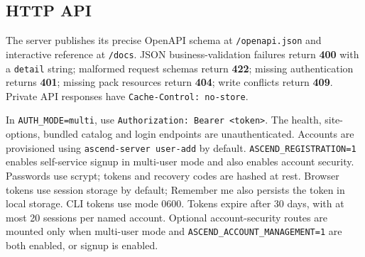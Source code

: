 \hypertarget{http-api}{%
\subsection{HTTP API}\label{http-api}}

The server publishes its precise OpenAPI schema at
\texttt{/openapi.json} and interactive reference at \texttt{/docs}. JSON
business-validation failures return \textbf{400} with a \texttt{detail}
string; malformed request schemas return \textbf{422}; missing
authentication returns \textbf{401}; missing pack resources return
\textbf{404}; write conflicts return \textbf{409}. Private API responses
have \texttt{Cache-Control: no-store}.

In \texttt{AUTH\_MODE=multi}, use
\texttt{Authorization: Bearer \textless{}token\textgreater{}}. The
health, site-options, bundled catalog and login endpoints are unauthenticated.
Accounts are provisioned using \texttt{ascend-server user-add} by default.
\texttt{ASCEND\_REGISTRATION=1} enables self-service signup in multi-user mode
and also enables account security. Passwords use scrypt; tokens and recovery
codes are hashed at rest. Browser tokens use session storage by default;
Remember me also persists the token in local storage. CLI tokens use mode 0600.
Tokens expire after 30 days, with at most 20 sessions per named account.
Optional account-security routes are mounted only when multi-user mode and
\texttt{ASCEND\_ACCOUNT\_MANAGEMENT=1} are both enabled, or signup is enabled.

